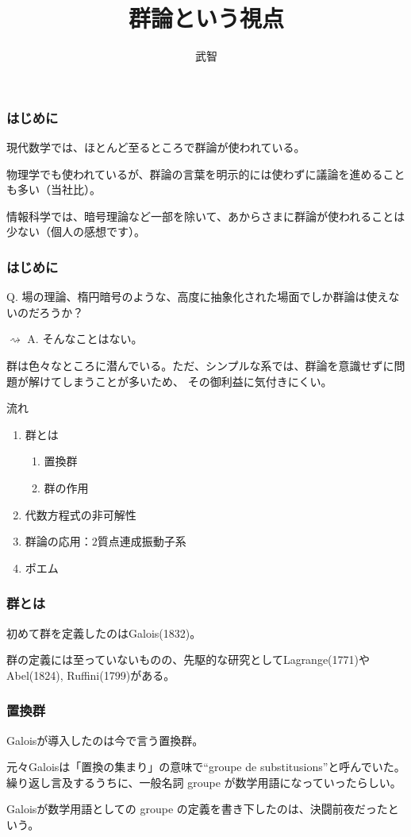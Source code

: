 \documentclass[12pt, t]{beamer}
\title{群論という視点}
\author{武智}
\begin{document}
\frame{\maketitle}

\begin{frame}
\frametitle{はじめに}
現代数学では、ほとんど至るところで群論が使われている。

物理学でも使われているが、群論の言葉を明示的には使わずに議論を進めることも多い（当社比）。

情報科学では、暗号理論など一部を除いて、あからさまに群論が使われることは少ない（個人の感想です）。
\end{frame}

\begin{frame}
\frametitle{はじめに}
Q. 場の理論、楕円暗号のような、高度に抽象化された場面でしか群論は使えないのだろうか？

$\rightsquigarrow$ A. そんなことはない。

群は色々なところに潜んでいる。ただ、シンプルな系では、群論を意識せずに問題が解けてしまうことが多いため、
その御利益に気付きにくい。
\end{frame}


\begin{frame}{流れ}
\begin{enumerate}
\item 群とは
\begin{enumerate}
\item 置換群
\item 群の作用
\end{enumerate}
\item 代数方程式の非可解性
\item 群論の応用：$2$質点連成振動子系
\item ポエム
\end{enumerate}
\end{frame}

\begin{frame}
\frametitle{群とは}
初めて群を定義したのはGalois(1832)。

群の定義には至っていないものの、先駆的な研究としてLagrange(1771)やAbel(1824), Ruffini(1799)がある。

\end{frame}

\begin{frame}
\frametitle{置換群}
Galoisが導入したのは今で言う置換群。

元々Galoisは「置換の集まり」の意味で``groupe de substitusions''と呼んでいた。
繰り返し言及するうちに、一般名詞 groupe が数学用語になっていったらしい。

Galoisが数学用語としての groupe の定義を書き下したのは、決闘前夜だったという\cite{Neumann2011}。
\end{frame}
\end{document}
